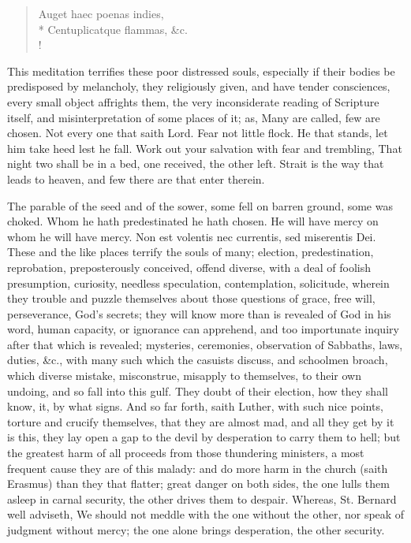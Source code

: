{\begin{latin}
\begin{verse}
Auget haec poenas indies,\\*
Centuplicatque flammas, \&c.\\!
\end{verse}
\end{latin}

This meditation terrifies these poor distressed souls, especially if
their bodies be predisposed by melancholy, they religiously given, and
have tender consciences, every small object affrights them, the very
inconsiderate reading of Scripture itself, and misinterpretation of
some places of it; as, Many are called, few are chosen. Not every one
that saith Lord. Fear not little flock. He that stands, let him take
heed lest he fall. Work out your salvation with fear and trembling,
That night two shall be in a bed, one received, the other left. Strait
is the way that leads to heaven, and few there are that enter therein.

The parable of the seed and of the sower, some fell on barren ground,
some was choked. Whom he hath predestinated he hath chosen. He will
have mercy on whom he will have mercy. Non est volentis nec currentis,
sed miserentis Dei. These and the like places terrify the souls of
many; election, predestination, reprobation, preposterously conceived,
offend diverse, with a deal of foolish presumption, curiosity, needless
speculation, contemplation, solicitude, wherein they trouble and puzzle
themselves about those questions of grace, free will, perseverance,
God's secrets; they will know more than is revealed of God in his word,
human capacity, or ignorance can apprehend, and too importunate inquiry
after that which is revealed; mysteries, ceremonies, observation of
Sabbaths, laws, duties, \&c., with many such which the casuists discuss,
and schoolmen broach, which diverse mistake, misconstrue, misapply to
themselves, to their own undoing, and so fall into this gulf. They
doubt of their election, how they shall know, it, by what signs. And so
far forth, saith Luther, with such nice points, torture and crucify
themselves, that they are almost mad, and all they get by it is this,
they lay open a gap to the devil by desperation to carry them to hell;
but the greatest harm of all proceeds from those thundering ministers,
a most frequent cause they are of this malady: and do more harm
in the church (saith Erasmus) than they that flatter; great danger on
both sides, the one lulls them asleep in carnal security, the other
drives them to despair. Whereas, St. Bernard well adviseth, We
should not meddle with the one without the other, nor speak of judgment
without mercy; the one alone brings desperation, the other security.

}
